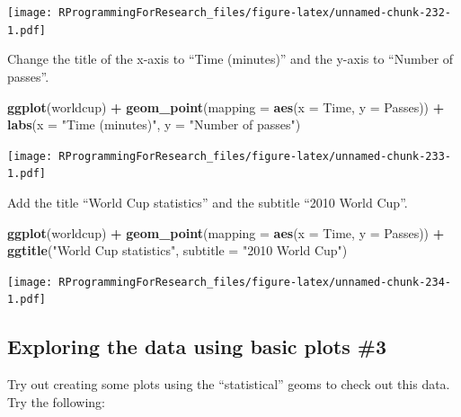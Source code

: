 \documentclass[]{book}
\makeatletter
\newenvironment{Shaded}{\begin{snugshade}}{\end{snugshade}}
\newcommand{\KeywordTok}[1]{\textcolor[rgb]{0.13,0.29,0.53}{\textbf{#1}}}
\newcommand{\DataTypeTok}[1]{\textcolor[rgb]{0.13,0.29,0.53}{#1}}
\newcommand{\StringTok}[1]{\textcolor[rgb]{0.31,0.60,0.02}{#1}}
\newcommand{\OperatorTok}[1]{\textcolor[rgb]{0.81,0.36,0.00}{\textbf{#1}}}
\newcommand{\NormalTok}[1]{#1}
\newenvironment{kframe}{%
\medskip{}
\setlength{\fboxsep}{.8em}
 \def\at@end@of@kframe{}%
 \ifinner\ifhmode%
  \def\at@end@of@kframe{\end{minipage}}%
  \begin{minipage}{\columnwidth}%
 \fi\fi%
 \def\FrameCommand##1{\hskip\@totalleftmargin \hskip-\fboxsep
 \colorbox{shadecolor}{##1}\hskip-\fboxsep
     \hskip-\linewidth \hskip-\@totalleftmargin \hskip\columnwidth}%
 \MakeFramed {\advance\hsize-\width
   \@totalleftmargin\z@ \linewidth\hsize
   \@setminipage}}%
 {\par\unskip\endMakeFramed%
 \at@end@of@kframe}
\renewenvironment{Shaded}{\begin{kframe}}{\end{kframe}}
\theoremstyle{definition}
\theoremstyle{definition}
\theoremstyle{definition}
\theoremstyle{remark}
\makeatother
\begin{document}
\texttt{[image: RProgrammingForResearch\_files/figure-latex/unnamed-chunk-232-1.pdf]}

Change the title of the x-axis to ``Time (minutes)'' and the y-axis to
``Number of passes''.

\begin{Shaded}
\begin{Highlighting}[]
\KeywordTok{ggplot}\NormalTok{(worldcup) }\OperatorTok{+}\StringTok{ }
\StringTok{  }\KeywordTok{geom_point}\NormalTok{(}\DataTypeTok{mapping =} \KeywordTok{aes}\NormalTok{(}\DataTypeTok{x =}\NormalTok{ Time, }\DataTypeTok{y =}\NormalTok{ Passes)) }\OperatorTok{+}\StringTok{ }
\StringTok{  }\KeywordTok{labs}\NormalTok{(}\DataTypeTok{x =} \StringTok{"Time (minutes)"}\NormalTok{, }\DataTypeTok{y =} \StringTok{"Number of passes"}\NormalTok{)}
\end{Highlighting}
\end{Shaded}

\texttt{[image: RProgrammingForResearch\_files/figure-latex/unnamed-chunk-233-1.pdf]}

Add the title ``World Cup statistics'' and the subtitle ``2010 World
Cup''.

\begin{Shaded}
\begin{Highlighting}[]
\KeywordTok{ggplot}\NormalTok{(worldcup) }\OperatorTok{+}\StringTok{ }
\StringTok{  }\KeywordTok{geom_point}\NormalTok{(}\DataTypeTok{mapping =} \KeywordTok{aes}\NormalTok{(}\DataTypeTok{x =}\NormalTok{ Time, }\DataTypeTok{y =}\NormalTok{ Passes)) }\OperatorTok{+}\StringTok{ }
\StringTok{  }\KeywordTok{ggtitle}\NormalTok{(}\StringTok{"World Cup statistics"}\NormalTok{,}
          \DataTypeTok{subtitle =} \StringTok{"2010 World Cup"}\NormalTok{)}
\end{Highlighting}
\end{Shaded}

\texttt{[image: RProgrammingForResearch\_files/figure-latex/unnamed-chunk-234-1.pdf]}

\subsection{Exploring the data using basic plots
\#3}\label{exploring-the-data-using-basic-plots-3}

Try out creating some plots using the ``statistical'' geoms to check out
this data. Try the following:
\end{document}
